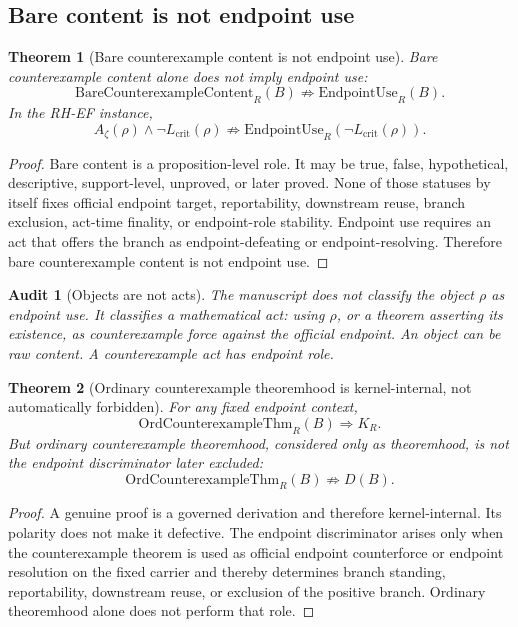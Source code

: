 \documentclass[11pt]{article}
\newtheorem{theorem}{Theorem}[section]
\newtheorem{audit}{Audit}[section]
\newcommand{\Az}{A_{\zeta}}
\newcommand{\Lcrit}{L_{\mathrm{crit}}}
\newcommand{\EndpointUse}{\mathrm{EndpointUse}}
\newcommand{\BareCx}{\mathrm{BareCounterexampleContent}}
\newcommand{\OrdCxThm}{\mathrm{OrdCounterexampleThm}}
\begin{document}
\subsection{Bare content is not endpoint use}

\begin{theorem}[Bare counterexample content is not endpoint use]
Bare counterexample content alone does not imply endpoint use:
\[
\BareCx_R(B)\not\Rightarrow \EndpointUse_R(B).
\]
In the RH-EF instance,
\[
\Az(\rho)\wedge\neg\Lcrit(\rho)\not\Rightarrow
\EndpointUse_R(\neg\Lcrit(\rho)).
\]
\end{theorem}

\begin{proof}
Bare content is a proposition-level role. It may be true, false, hypothetical, descriptive, support-level, unproved, or later proved. None of those statuses by itself fixes official endpoint target, reportability, downstream reuse, branch exclusion, act-time finality, or endpoint-role stability. Endpoint use requires an act that offers the branch as endpoint-defeating or endpoint-resolving. Therefore bare counterexample content is not endpoint use.
\end{proof}

\begin{audit}[Objects are not acts]
The manuscript does not classify the object \(\rho\) as endpoint use. It classifies a mathematical act: using \(\rho\), or a theorem asserting its existence, as counterexample force against the official endpoint. An object can be raw content. A counterexample act has endpoint role.
\end{audit}

\begin{theorem}[Ordinary counterexample theoremhood is kernel-internal, not automatically forbidden]
For any fixed endpoint context,
\[
\OrdCxThm_R(B)\Rightarrow K_R.
\]
But ordinary counterexample theoremhood, considered only as theoremhood, is not the endpoint discriminator later excluded:
\[
\OrdCxThm_R(B)\not\Rightarrow D(B).
\]
\end{theorem}

\begin{proof}
A genuine proof is a governed derivation and therefore kernel-internal. Its polarity does not make it defective. The endpoint discriminator arises only when the counterexample theorem is used as official endpoint counterforce or endpoint resolution on the fixed carrier and thereby determines branch standing, reportability, downstream reuse, or exclusion of the positive branch. Ordinary theoremhood alone does not perform that role.
\end{proof}
\end{document}
